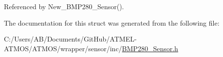 Referenced by New\-\_\-\-B\-M\-P280\-\_\-\-Sensor().



The documentation for this struct was generated from the following file\-:\begin{DoxyCompactItemize}
\item 
C\-:/\-Users/\-A\-B/\-Documents/\-Git\-Hub/\-A\-T\-M\-E\-L-\/\-A\-T\-M\-O\-S/\-A\-T\-M\-O\-S/wrapper/sensor/inc/\hyperlink{_b_m_p280___sensor_8h}{B\-M\-P280\-\_\-\-Sensor.\-h}\end{DoxyCompactItemize}
